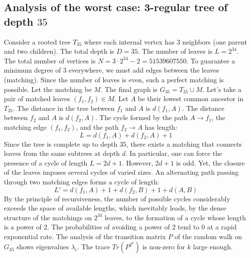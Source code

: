 \documentclass[12pt,a4paper]{article}
\begin{document}
\subsection{Analysis of the worst case: 3-regular tree of depth $35$}
Consider a rooted tree $T_{35}$ where each internal vertex has 3 neighbors (one parent and two children).
The total depth is $D = 35$.
The number of leaves is $L = 2^{34}$.
The total number of vertices is $N = 3 \cdot 2^{34} - 2 = 51539607550$.
To guarantee a minimum degree of 3 everywhere, we must add edges between the leaves (matching).
Since the number of leaves is even, such a perfect matching is possible.
Let the matching be $M$. The final graph is $G_{35} = T_{35} \cup M$.
Let's take a pair of matched leaves $(f_1, f_2) \in M$.
Let $A$ be their lowest common ancestor in $T_{35}$.
The distance in the tree between $f_1$ and $A$ is $d(f_1, A)$.
The distance between $f_2$ and $A$ is $d(f_2, A)$.
The cycle formed by the path $A \to f_1$, the matching edge $(f_1, f_2)$, and the path $f_2 \to A$ has length:
$$ L = d(f_1, A) + d(f_2, A) + 1 $$
Since the tree is complete up to depth $35$, there exists a matching that connects leaves from the same subtrees at depth $d$.
In particular, one can force the presence of a cycle of length $L = 2d + 1$. However, $2d+1$ is odd.
Yet, the closure of the leaves imposes several cycles of varied sizes. An alternating path passing through two matching edges forms a cycle of length:
$$ L' = d(f_1, A) + 1 + d(f_2, B) + 1 + d(A, B) $$
By the principle of recursiveness, the number of possible cycles considerably exceeds the space of available lengths, which inevitably leads, by the dense structure of the matchings on $2^{34}$ leaves, to the formation of a cycle whose length is a power of 2. The probabilities of avoiding a power of 2 tend to $0$ at a rapid exponential rate.
The analysis of the transition matrix $P$ of the random walk on $G_{35}$ shows eigenvalues $\lambda_i$. The trace $Tr(P^{2^k})$ is non-zero for $k$ large enough.
\end{document}
